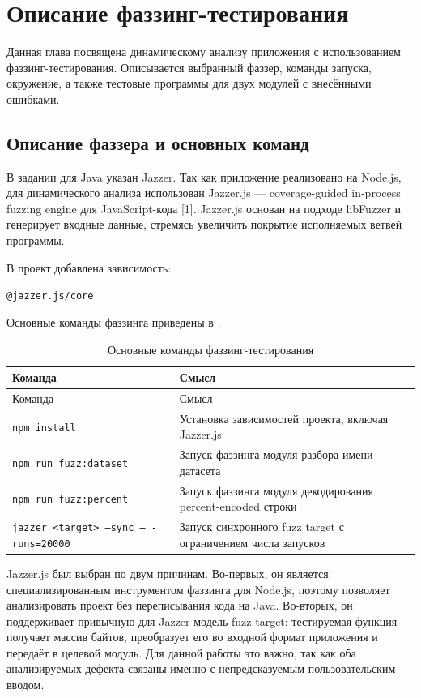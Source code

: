 \chapter{Описание фаззинг-тестирования} \label{ch1}

Данная глава посвящена динамическому анализу приложения с использованием
фаззинг-тестирования. Описывается выбранный фаззер, команды запуска, окружение,
а также тестовые программы для двух модулей с внесёнными ошибками.

\section{Описание фаззера и основных команд} \label{ch1:sec1}

В задании для Java указан Jazzer. Так как приложение реализовано на Node.js, для
динамического анализа использован Jazzer.js --- coverage-guided in-process fuzzing
engine для JavaScript-кода [1]. Jazzer.js основан на подходе libFuzzer
и генерирует входные данные, стремясь увеличить покрытие исполняемых ветвей
программы.

В проект добавлена зависимость:
\begin{center}
\texttt{@jazzer.js/core}
\end{center}

Основные команды фаззинга приведены в .

\noindent
\begingroup
\centering
\small
\begin{longtable}[c]{|p{6cm}|p{9cm}|}
    \caption{Основные команды фаззинг-тестирования}
    \label{tab:fuzz-commands}
    \\
    \hline
    Команда & Смысл \\ \hline
    \endfirsthead
    \hline
    Команда & Смысл \\ \hline
    \endhead
    \hline
    \texttt{npm install} & Установка зависимостей проекта, включая Jazzer.js \\ \hline
    \texttt{npm run fuzz:dataset} & Запуск фаззинга модуля разбора имени датасета \\ \hline
    \texttt{npm run fuzz:percent} & Запуск фаззинга модуля декодирования percent-encoded строки \\ \hline
    \texttt{jazzer <target> --sync -- -runs=20000} & Запуск синхронного fuzz target с ограничением числа запусков \\ \hline
\end{longtable}
\normalsize
\endgroup

Jazzer.js был выбран по двум причинам. Во-первых, он является специализированным
инструментом фаззинга для Node.js, поэтому позволяет анализировать проект без
переписывания кода на Java. Во-вторых, он поддерживает привычную для Jazzer модель
fuzz target: тестируемая функция получает массив байтов, преобразует его во входной
формат приложения и передаёт в целевой модуль. Для данной работы это важно, так как
оба анализируемых дефекта связаны именно с непредсказуемым пользовательским
вводом.

